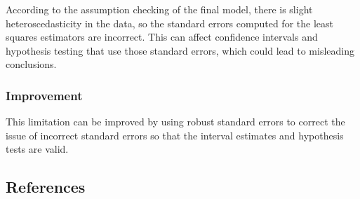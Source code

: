 \documentclass[letterpaper,9pt,twocolumn,twoside,]{pinp}
\begin{document}
According to the assumption checking of the final model, there is slight
heteroscedasticity in the data, so the standard errors computed for the
least squares estimators are incorrect. This can affect confidence
intervals and hypothesis testing that use those standard errors, which
could lead to misleading conclusions.

\hypertarget{improvement}{%
\subsubsection{Improvement}\label{improvement}}

This limitation can be improved by using robust standard errors to
correct the issue of incorrect standard errors so that the interval
estimates and hypothesis tests are valid.

\hypertarget{references}{%
\subsection{References}\label{references}}
\end{document}

